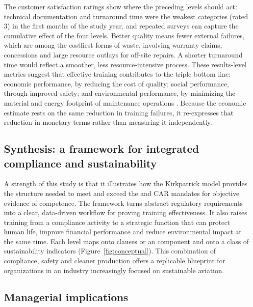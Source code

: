 The customer satisfaction ratings show where the preceding levels should act: technical documentation and turnaround time were the weakest categories (rated 3) in the first months of the study year, and repeated surveys can capture the cumulative effect of the four levels. Better quality means fewer external failures, which are among the costliest forms of waste, involving warranty claims, concessions and large resource outlays for off-site repairs. A shorter turnaround time would reflect a smoother, less resource-intensive process. These results-level metrics suggest that effective training contributes to the triple bottom line: economic performance, by reducing the cost of quality; social performance, through improved safety; and environmental performance, by minimizing the material and energy footprint of maintenance operations \parencite{Sousa2025}.  Because the economic estimate rests on the same reduction in training failures, it re-expresses that reduction in monetary terms rather than measuring it independently.

\subsection{Synthesis: a framework for integrated compliance and sustainability}
\label{subsec:disc-synthesis}

A strength of this study is that it illustrates how the Kirkpatrick model provides the structure needed to meet and exceed the \AS{} and CAR mandates for objective evidence of competence. The framework turns abstract regulatory requirements into a clear, data-driven workflow for proving training effectiveness. It also raises training from a compliance activity to a strategic function that can protect human life, improve financial performance and reduce environmental impact at the same time. Each level maps onto \AS{} clauses or an \SMS{} component and onto a class of sustainability indicators (Figure~\ref{fig:conceptual}). This combination of compliance, safety and cleaner production offers a replicable blueprint for \MRO{} organizations in an industry increasingly focused on sustainable aviation.

\subsection{Managerial implications}
\label{subsec:managerial}

